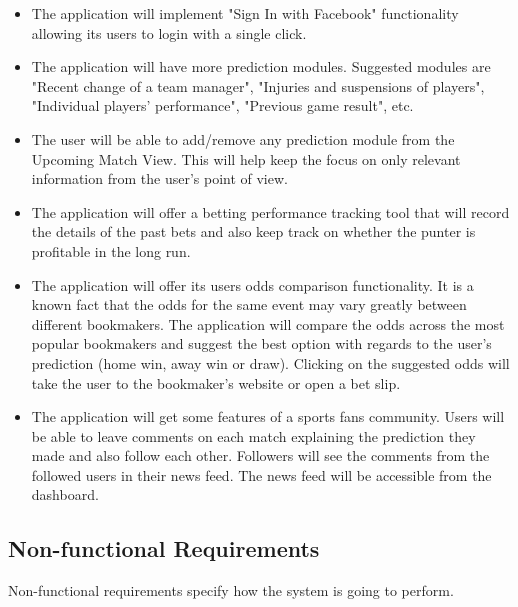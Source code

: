 \begin{itemize}
    \item The application will implement "Sign In with Facebook" functionality allowing its users to login with a single click.
    \item The application will have more prediction modules. Suggested modules are "Recent change of a team manager", "Injuries and suspensions of players", "Individual players' performance", "Previous game result", etc.
    \item The user will be able to add/remove any prediction module from the Upcoming Match View. This will help keep the focus on only relevant information from the user's point of view.
    \item The application will offer a betting performance tracking tool that will record the details of the past bets and also keep track on whether the punter is profitable in the long run.
    \item The application will offer its users odds comparison functionality. It is a known fact that the odds for the same event may vary greatly between different bookmakers. The application will compare the odds across the most popular bookmakers and suggest the best option with regards to the user's prediction (home win, away win or draw). Clicking on the suggested odds will take the user to the bookmaker's website or open a bet slip.
    \item The application will get some features of a sports fans community. Users will be able to leave comments on each match explaining the prediction they made and also follow each other. Followers will see the comments from the followed users in their news feed. The news feed will be accessible from the dashboard.
\end{itemize}

\subsection{Non-functional Requirements}
\label{sec:nonfunctional_req}
Non-functional requirements specify how the system is going to perform. 

